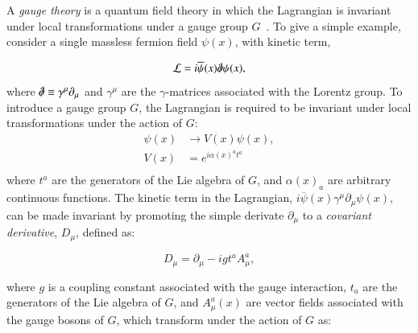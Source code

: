 
A \emph{gauge theory} is a quantum field theory in which the Lagrangian is invariant under local transformations under a gauge group $G$~\cite{peskinschroeder}. To give a simple example, consider a single massless fermion field $\psi(x)$, with kinetic term,

\begin{equation}
	\mathcal{L} = i\overline{\psi}(x) \slashed{\partial} \psi(x),
\end{equation}
where $\slashed{\partial}\equiv \gamma^{\mu}\partial_{\mu}$ and $\gamma^{\mu}$ are the $\gamma$-matrices associated with the Lorentz group. To introduce a gauge group $G$, the Lagrangian is required to be invariant under local transformations under the action of $G$:
 \begin{align*}
 	\psi(x) &\rightarrow V(x) \psi(x), \\
 	V(x) &= e^{i\alpha(x)^a t^a} \\
 \end{align*}
 where $t^a$ are the generators of the Lie algebra of $G$, and $\alpha(x)_a$ are arbitrary continuous functions. The kinetic term in the Lagrangian, $i\overline{\psi}(x)\gamma^{\mu}\partial_{\mu}\psi(x)$, can be made invariant by promoting the simple derivate $\partial_{\mu}$ to a \emph{covariant derivative}, $D_{\mu}$, defined as:

\begin{equation}\label{eqn:covariant-derivative-qcd}
	D_{\mu} = \partial_{\mu} - i g t^a A^a_{\mu},
\end{equation}

where $g$ is a coupling constant associated with the gauge interaction, $t_a$ are the generators of the Lie algebra of $G$, and $A^a_{\mu}(x)$ are vector fields associated with the gauge bosons of $G$, which transform under the action of $G$ as:

